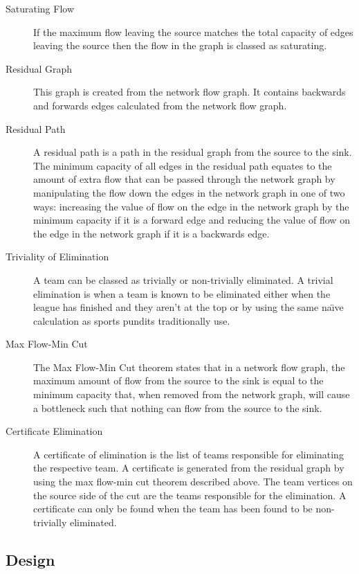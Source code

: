 \begin{description}
\item[Saturating Flow] If the maximum flow leaving the source matches the total
capacity of edges leaving the source then the flow in the graph is classed as
saturating.

\item[Residual Graph] This graph is created from the network flow graph. It
contains backwards and forwards edges calculated from the network flow
graph.

\item[Residual Path] A residual path is a path in the residual graph from
the source to the sink. The minimum capacity of all edges in the residual
path equates to the amount of extra flow that can be passed through the
network graph by manipulating the flow down the edges in the network graph in 
one of two ways: increasing the value of flow on the edge in the network graph 
by the minimum capacity if it is a forward edge and reducing the value of flow
on the edge in the network graph if it is a backwards edge.

\item[Triviality of Elimination] A team can be classed as trivially or
non-trivially eliminated. A trivial elimination is when a team is known to be
eliminated either when the league has finished and they aren't at the top or
by using the same na\"{\i}ve calculation as sports pundits traditionally
use.

\item[Max Flow-Min Cut] The Max Flow-Min Cut theorem states that in a network
flow graph, the maximum amount of flow from the source to the sink is equal
to the minimum capacity that, when removed from the network graph, will
cause a bottleneck such that nothing can flow from the source to the sink.

\item[Certificate Elimination] A certificate of elimination is the list of
teams responsible for eliminating the respective team. A certificate is
generated from the residual graph by using the max flow-min cut theorem
described above. The team vertices on the source side of the cut are the
teams responsible for the elimination. A certificate can only be found when
the team has been found to be non-trivially eliminated.

\end{description}

\subsection{Design}

